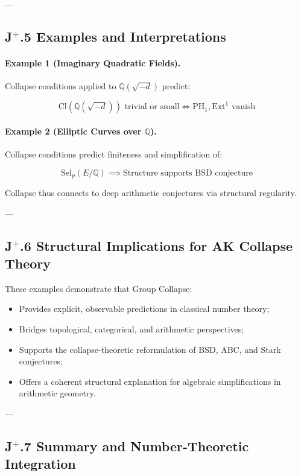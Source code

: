 \documentclass[11pt]{article}
\begin{document}
---

\subsection*{J$^{+}$.5 Examples and Interpretations}

\paragraph{Example 1 (Imaginary Quadratic Fields).}

Collapse conditions applied to $\mathbb{Q}(\sqrt{-d})$ predict:

\[
\mathrm{Cl}(\mathbb{Q}(\sqrt{-d})) \text{ trivial or small} \iff \mathrm{PH}_1, \mathrm{Ext}^1 \text{ vanish}
\]

\paragraph{Example 2 (Elliptic Curves over $\mathbb{Q}$).}

Collapse conditions predict finiteness and simplification of:

\[
\mathrm{Sel}_p(E/\mathbb{Q}) \implies \text{Structure supports BSD conjecture}
\]

Collapse thus connects to deep arithmetic conjectures via structural regularity.

---

\subsection*{J$^{+}$.6 Structural Implications for AK Collapse Theory}

These examples demonstrate that Group Collapse:

\begin{itemize}
    \item Provides explicit, observable predictions in classical number theory;
    \item Bridges topological, categorical, and arithmetic perspectives;
    \item Supports the collapse-theoretic reformulation of BSD, ABC, and Stark conjectures;
    \item Offers a coherent structural explanation for algebraic simplifications in arithmetic geometry.
\end{itemize}

---

\subsection*{J$^{+}$.7 Summary and Number-Theoretic Integration}
\end{document}
